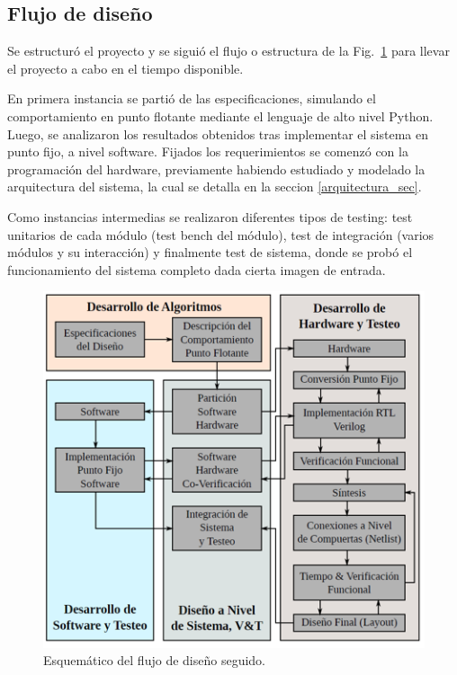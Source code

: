 \documentclass[]{IEEEphot}
\begin{document}
\subsection{Flujo de diseño} \label{flujo_subsecc}

Se estructuró el proyecto y se siguió el flujo o estructura de la
Fig.~\ref{design_flow} para llevar el proyecto a cabo en el tiempo disponible.

En primera instancia se partió de las especificaciones, simulando el comportamiento en punto flotante mediante el lenguaje de alto nivel Python. Luego, se analizaron los resultados obtenidos tras implementar el sistema en punto fijo, a nivel software. 
Fijados los requerimientos se comenzó con la programación del hardware,
previamente habiendo estudiado y modelado la arquitectura del sistema, la cual
se detalla en la seccion \ref{arquitectura_sec}.

Como instancias intermedias se realizaron diferentes tipos de testing: test unitarios de cada módulo (test bench del módulo), test de integración (varios módulos y su interacción) y finalmente test de sistema, donde se probó el funcionamiento del sistema completo dada cierta imagen de entrada.

\begin{figure}
\centering
\includegraphics{flujo_de_dis.png}
\caption{Esquemático del flujo de diseño seguido.}
\label{design_flow}
\end{figure}

\end{document}
